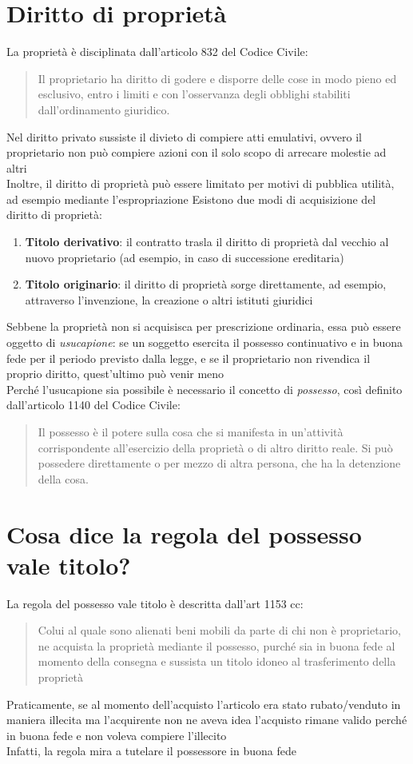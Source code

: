 \documentclass[8pt,oneside,a4paper]{article}
\begin{document}
	\section{Diritto di proprietà}
	La proprietà è disciplinata dall'articolo 832 del Codice Civile:
	\begin{quote}
		Il proprietario ha diritto di godere e disporre delle cose in modo pieno ed esclusivo, entro i limiti e con l'osservanza degli obblighi stabiliti dall'ordinamento giuridico.
	\end{quote}
	Nel diritto privato sussiste il divieto di compiere atti emulativi, ovvero il proprietario non può compiere azioni con il solo scopo di arrecare molestie ad altri\\
	Inoltre, il diritto di proprietà può essere limitato per motivi di pubblica utilità, ad esempio mediante l'espropriazione
	Esistono due modi di acquisizione del diritto di proprietà:
	\begin{enumerate}
		\item \textbf{Titolo derivativo}: il contratto trasla il diritto di proprietà dal vecchio al nuovo proprietario (ad esempio, in caso di successione ereditaria)
		\item \textbf{Titolo originario}: il diritto di proprietà sorge direttamente, ad esempio, attraverso l'invenzione, la creazione o altri istituti giuridici
	\end{enumerate}
	Sebbene la proprietà non si acquisisca per prescrizione ordinaria, essa può essere oggetto di \textit{usucapione}: se un soggetto esercita il possesso continuativo e in buona fede per il periodo previsto dalla legge, e se il proprietario non rivendica il proprio diritto, quest'ultimo può venir meno\\
	Perché l'usucapione sia possibile è necessario il concetto di \textit{possesso}, così definito dall'articolo 1140 del Codice Civile:
	\begin{quote}
		Il possesso è il potere sulla cosa che si manifesta in un'attività corrispondente all'esercizio della proprietà o di altro diritto reale. Si può possedere direttamente o per mezzo di altra persona, che ha la detenzione della cosa.
	\end{quote}
	\section{Cosa dice la regola del possesso vale titolo?}
	La regola del possesso vale titolo è descritta dall'art 1153 cc:
	\begin{quote}
		Colui al quale sono alienati beni mobili da parte di chi non è proprietario, ne acquista la proprietà mediante il possesso, purché sia in buona fede al momento della consegna e sussista un titolo idoneo al trasferimento della proprietà
	\end{quote}
	Praticamente, se al momento dell'acquisto l'articolo era stato rubato/venduto in maniera illecita ma l'acquirente non ne aveva idea l'acquisto rimane valido perché in buona fede e non voleva compiere l'illecito\\
	Infatti, la regola mira a tutelare il possessore in buona fede
\end{document}
